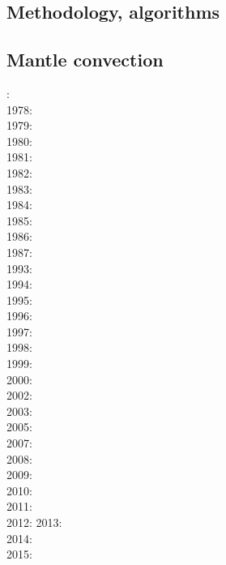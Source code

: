 \cite{yatd12}
\cite{lorg18}

\subsection*{Methodology, algorithms}

\cite{leka93}

\subsection*{Mantle convection}

: \cite{hemw75}\\
1978: \cite{mahz78}\\
1979: \cite{ludt79}\cite{buss79}\\
1980: \cite{olco80}\cite{jamc80}\\
1981: \cite{buss81}\\
1982: \cite{jape82}\cite{homc82}\\
1983: \cite{hous83}\cite{hous83b}\\
1984: \cite{olyb84}\cite{jarv84}\cite{haeb84}\cite{harp84}\cite{davi84}\cite{boas84}\\
1985: \cite{jarv85}\cite{baum85}\\
1986: \cite{davi86}\\
1987: \cite{yuqh87}\\
1993: \cite{zhch93}\cite{jarv93}\cite{tack93}\cite{bucc93}\\
1994: \cite{haeb94}\\
1995: \cite{zhgu95}\\
1996: \cite{zhyu96}\cite{hond96}\cite{rytr96a}\cite{rytr96b}\cite{tack96}\cite{trbo96}\cite{birg96}\\
1997: \cite{hond97}\cite{iwho97}\\
1998: \cite{ande98}\cite{iwho98}\cite{devv98}\cite{tack98}\cite{tack98b}\cite{trha98b}\cite{trha98}\\
1999: \cite{duyr99}\\
2000: \cite{albe00}\cite{hayu00}\cite{devv00b}\cite{tack00b}\cite{zhzm00}\\
2002: \cite{tasu02}\\
2003: \cite{hapa03}\\
2005: \cite{taxn05}\cite{bupc05}\\
2007: \cite{nake07}\\
2008: \cite{tack08}\\
2009: \cite{wodd09}\\
2010: \cite{bumb10}\\
2011: \cite{lowm11}\cite{rota11}\cite{woda11}\\
2012: \cite{bisa12}
2013: \cite{holj13}\cite{dadb13}\cite{toyd13}\\
2014: \cite{arfw14}\cite{helo14}\\
2015: \cite{thkp15}

